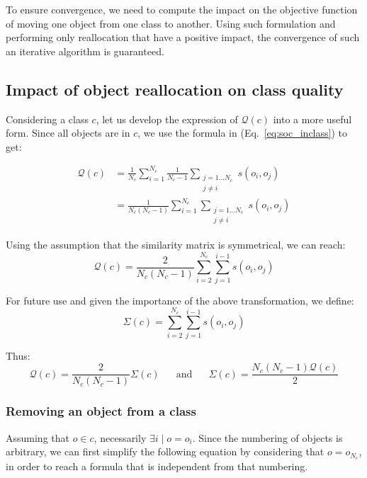 \documentclass[10pt,letterpaper]{article}
\begin{document}
To ensure convergence, we need to compute the impact on the objective function of moving one object from one class to another. Using such formulation and performing only reallocation that have a positive impact, the convergence of such an iterative algorithm is guaranteed.

\subsection{Impact of object reallocation on class quality}

Considering a class $c$, let us develop the expression of $\mathcal{Q}(c)$ into a more useful form. Since all objects are in $c$, we use the formula in (Eq.~\ref{eq:soc_inclass}) to get:

\begin{equation*}
  \begin{aligned}
    \mathcal{Q}\left(c\right) & = \frac{1}{N_c} \sum_{i=1}^{N_c} \frac{1}{N_c-1} \sum_{\substack{j=1 \ldots N_c\\j \neq i}} s\left(o_i, o_j\right) \\
                              & = \frac{1}{N_c(N_c-1)} \sum_{i=1}^{N_c} \sum_{\substack{j=1 \ldots N_c\\j \neq i}} s\left(o_i, o_j\right)
  \end{aligned}
\end{equation*}

Using the assumption that the similarity matrix is symmetrical, we can reach: %
\begin{equation}
    \mathcal{Q}\left(c\right) = \frac{2}{N_c(N_c-1)} \sum_{i=2}^{N_c} \sum_{j=1}^{i-1} s\left(o_i, o_j\right)
    \label{eq:classQuality}
\end{equation}

For future use and given the importance of the above transformation, we define:
\[
  \Sigma(c) = \sum_{i=2}^{N_c} \sum_{j=1}^{i-1} s\left(o_i, o_j\right)
\]

Thus:
\[
\mathcal{Q}\left(c\right) = \frac{2}{N_c(N_c-1)}\Sigma(c) \phantom{XX}\mathrm{and}\phantom{XX} \Sigma(c) = \frac{N_c(N_c-1)\mathcal{Q}\left(c\right)}{2}
\]

\subsubsection{Removing an object from a class}

Assuming that $o \in c$, necessarily $\exists i \mid o=o_i$. Since the numbering of objects is arbitrary, we can first simplify the following equation by considering that $o = o_{N_c}$, in order to reach a formula that is independent from that numbering.
\end{document}
